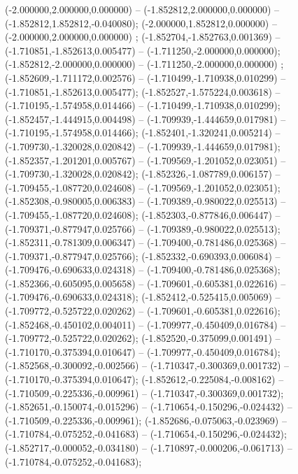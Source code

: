  (-2.000000,2.000000,0.000000) -- (-1.852812,2.000000,0.000000) -- (-1.852812,1.852812,-0.040080);
 (-2.000000,1.852812,0.000000) -- (-2.000000,2.000000,0.000000) ;
 (-1.852704,-1.852763,0.001369) -- (-1.710851,-1.852613,0.005477) -- (-1.711250,-2.000000,0.000000);
 (-1.852812,-2.000000,0.000000) -- (-1.711250,-2.000000,0.000000) ;
 (-1.852609,-1.711172,0.002576) -- (-1.710499,-1.710938,0.010299) -- (-1.710851,-1.852613,0.005477);
 (-1.852527,-1.575224,0.003618) -- (-1.710195,-1.574958,0.014466) -- (-1.710499,-1.710938,0.010299);
 (-1.852457,-1.444915,0.004498) -- (-1.709939,-1.444659,0.017981) -- (-1.710195,-1.574958,0.014466);
 (-1.852401,-1.320241,0.005214) -- (-1.709730,-1.320028,0.020842) -- (-1.709939,-1.444659,0.017981);
 (-1.852357,-1.201201,0.005767) -- (-1.709569,-1.201052,0.023051) -- (-1.709730,-1.320028,0.020842);
 (-1.852326,-1.087789,0.006157) -- (-1.709455,-1.087720,0.024608) -- (-1.709569,-1.201052,0.023051);
 (-1.852308,-0.980005,0.006383) -- (-1.709389,-0.980022,0.025513) -- (-1.709455,-1.087720,0.024608);
 (-1.852303,-0.877846,0.006447) -- (-1.709371,-0.877947,0.025766) -- (-1.709389,-0.980022,0.025513);
 (-1.852311,-0.781309,0.006347) -- (-1.709400,-0.781486,0.025368) -- (-1.709371,-0.877947,0.025766);
 (-1.852332,-0.690393,0.006084) -- (-1.709476,-0.690633,0.024318) -- (-1.709400,-0.781486,0.025368);
 (-1.852366,-0.605095,0.005658) -- (-1.709601,-0.605381,0.022616) -- (-1.709476,-0.690633,0.024318);
 (-1.852412,-0.525415,0.005069) -- (-1.709772,-0.525722,0.020262) -- (-1.709601,-0.605381,0.022616);
 (-1.852468,-0.450102,0.004011) -- (-1.709977,-0.450409,0.016784) -- (-1.709772,-0.525722,0.020262);
 (-1.852520,-0.375099,0.001491) -- (-1.710170,-0.375394,0.010647) -- (-1.709977,-0.450409,0.016784);
 (-1.852568,-0.300092,-0.002566) -- (-1.710347,-0.300369,0.001732) -- (-1.710170,-0.375394,0.010647);
 (-1.852612,-0.225084,-0.008162) -- (-1.710509,-0.225336,-0.009961) -- (-1.710347,-0.300369,0.001732);
 (-1.852651,-0.150074,-0.015296) -- (-1.710654,-0.150296,-0.024432) -- (-1.710509,-0.225336,-0.009961);
 (-1.852686,-0.075063,-0.023969) -- (-1.710784,-0.075252,-0.041683) -- (-1.710654,-0.150296,-0.024432);
 (-1.852717,-0.000052,-0.034180) -- (-1.710897,-0.000206,-0.061713) -- (-1.710784,-0.075252,-0.041683);
